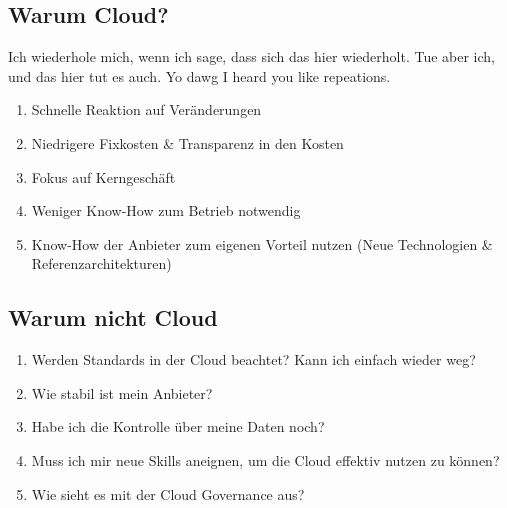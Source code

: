 \subsection{Warum Cloud?}
Ich wiederhole mich, wenn ich sage, dass sich das hier wiederholt. Tue aber ich, und das hier tut es auch. Yo dawg I heard you like repeations.
\begin{enumerate}
	\item Schnelle Reaktion auf Veränderungen
	\item Niedrigere Fixkosten \& Transparenz in den Kosten
	\item Fokus auf Kerngeschäft
	\item Weniger Know-How zum Betrieb notwendig
	\item Know-How der Anbieter zum eigenen Vorteil nutzen (Neue Technologien \& Referenzarchitekturen)
\end{enumerate}
\subsection{Warum nicht Cloud}
\begin{enumerate}
	\item Werden Standards in der Cloud beachtet? Kann ich einfach wieder weg?
	\item Wie stabil ist mein Anbieter?
	\item Habe ich die Kontrolle über meine Daten noch?
	\item Muss ich mir neue Skills aneignen, um die Cloud effektiv nutzen zu können?
	\item Wie sieht es mit der Cloud Governance aus?
\end{enumerate}
